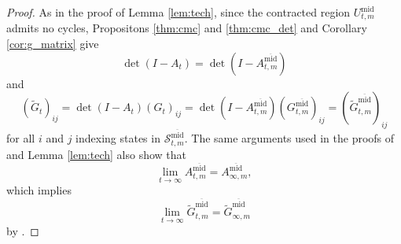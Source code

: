 \documentclass[11pt,hyp,]{nyjm}
\numberwithin{thm}{section}
\theoremstyle{definition}
\theoremstyle{remark}
\begin{document}
\begin{proof}
		As in the proof of Lemma \ref{lem:tech}, since the contracted region $U^\text{mid}_{t,m}$ admits no cycles, Propositons \ref{thm:cmc} and \ref{thm:cmc_det} and Corollary \ref{cor:g_matrix} give
		$$
		\det(I - A_t) = \det(I - A^{\overline{\text{mid}}}_{t,m})
		$$
		and
		$$
		(\widetilde{G}_t)_{ij} = \det(I - A_t)(G_t)_{ij} = \det(I - A^{\overline{\text{mid}}}_{t,m})(G^{\overline{\text{mid}}}_{t,m})_{ij} = (\widetilde{G}^{\overline{\text{mid}}}_{t,m})_{ij}
		$$
		for all $i$ and $j$ indexing states in $\mathcal{S}_{t,m}^{\overline{\text{mid}}}$. The same arguments used in the proofs of  and Lemma \ref{lem:tech} also show that
		\begin{equation}
			\label{eq:final_stab}
			\lim_{t \to \infty} A^{\overline{\text{mid}}}_{t,m} = A^{\overline{\text{mid}}}_{\infty,m},
		\end{equation}
		which implies 
		$$
		\lim_{t \to \infty} \widetilde{G}^{\overline{\text{mid}}}_{t,m} = \widetilde{G}^{\overline{\text{mid}}}_{\infty,m}
		$$
		by .
		

\end{proof}
\end{document}
